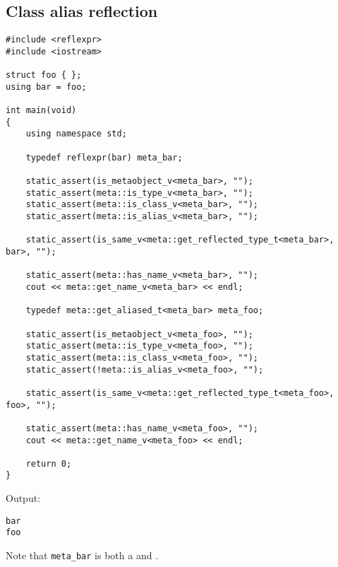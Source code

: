 \subsection{Class alias reflection}

\begin{verbatim}
#include <reflexpr>
#include <iostream>

struct foo { };
using bar = foo;

int main(void)
{
	using namespace std;

	typedef reflexpr(bar) meta_bar;

	static_assert(is_metaobject_v<meta_bar>, "");
	static_assert(meta::is_type_v<meta_bar>, "");
	static_assert(meta::is_class_v<meta_bar>, "");
	static_assert(meta::is_alias_v<meta_bar>, "");

	static_assert(is_same_v<meta::get_reflected_type_t<meta_bar>, bar>, "");

	static_assert(meta::has_name_v<meta_bar>, "");
	cout << meta::get_name_v<meta_bar> << endl;

	typedef meta::get_aliased_t<meta_bar> meta_foo;

	static_assert(is_metaobject_v<meta_foo>, "");
	static_assert(meta::is_type_v<meta_foo>, "");
	static_assert(meta::is_class_v<meta_foo>, "");
	static_assert(!meta::is_alias_v<meta_foo>, "");

	static_assert(is_same_v<meta::get_reflected_type_t<meta_foo>, foo>, "");

	static_assert(meta::has_name_v<meta_foo>, "");
	cout << meta::get_name_v<meta_foo> << endl;

	return 0;
}
\end{verbatim}

Output:

\begin{verbatim}
bar
foo
\end{verbatim}

Note that \texttt{meta\_bar} is both a  and .

